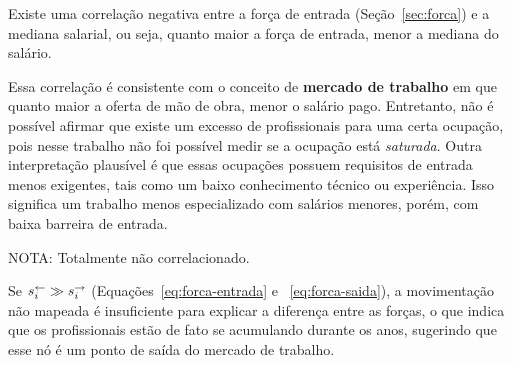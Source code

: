 \documentclass[12pt,a4paper]{article}
\begin{document}
\begin{hypothesis}
    Existe uma correlação negativa entre a força de entrada (Seção~\ref{sec:forca}) e a mediana salarial, ou seja, quanto maior a força de entrada, menor a mediana do salário.
\end{hypothesis}


Essa correlação é consistente com o conceito de \textbf{mercado de trabalho} em que quanto maior a oferta de mão de obra, menor o salário pago. Entretanto, não é possível afirmar que existe um excesso de profissionais para uma certa ocupação, pois nesse trabalho não foi possível medir se a ocupação está \textit{saturada}.
Outra interpretação plausível é que essas ocupações possuem requisitos de entrada menos exigentes, tais como um baixo conhecimento técnico ou experiência. Isso significa um trabalho menos especializado com salários menores, porém, com baixa barreira de entrada.


NOTA: Totalmente não correlacionado.

\begin{hypothesis}
    Se $s^\leftarrow_i \gg s^\rightarrow_i$ (Equações~\ref{eq:forca-entrada} e ~\ref{eq:forca-saida}), a movimentação não mapeada é insuficiente para explicar a diferença entre as forças, o que indica que os profissionais estão de fato se acumulando durante os anos, sugerindo que esse nó é um ponto de saída do mercado de trabalho.
\end{hypothesis}
\end{document}
